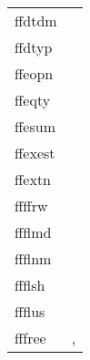 \documentclass[11pt]{book}
\begin{document}
\begin{tabular}{lr}
ffdtdm   & \pageref{ffdtdm} \\
ffdtyp    & \pageref{ffdtyp} \\
ffeopn    & \pageref{ffopen} \\
ffeqty    & \pageref{ffgtcl} \\
ffesum  & \pageref{ffesum} \\
ffexest  & \pageref{ffexist} \\
ffextn   & \pageref{ffextn} \\
ffffrw    & \pageref{ffffrw} \\
ffflmd      & \pageref{ffflmd} \\
ffflnm      & \pageref{ffflnm} \\
ffflsh     & \pageref{ffflus} \\
ffflus     & \pageref{ffflus} \\
fffree     & \pageref{ffgkls},  \pageref{ffhdr2str} \\
\end{tabular}
\end{document}
